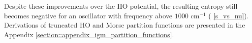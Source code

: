 \documentclass[../main.tex]{subfiles}
\begin{document}

Despite these improvements over the HO potential, the resulting entropy still becomes negative for an oscillator with frequency above $1000$ cm$^{-1}$ (\figurename{ \ref{s_vs_nu}}). Derivations of truncated HO and Morse partition functions are presented in the Appendix \ref{section::appendix_igm_partition_functions}.
\end{document}
